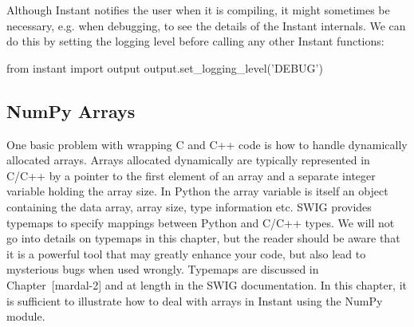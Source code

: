 
Although Instant notifies the user when it is compiling, it might
sometimes be necessary, e.g. when debugging, to see the details of the Instant
internals. We can do this by setting the logging level before calling any
other Instant functions:
\begin{python}
from instant import output
output.set_logging_level('DEBUG')
\end{python}

\subsection{NumPy Arrays}
One basic problem with wrapping C and C++ code is how to handle dynamically
allocated arrays. Arrays allocated
dynamically are typically represented in C/C++ by a pointer to the first element
of an array and a separate integer variable holding the array size. In Python
the array variable is itself an object containing the data array, array size,
type information etc. 
SWIG provides typemaps to specify  mappings between Python and C/C++ types. We
will not go into details on typemaps in this chapter, but the reader
should be aware that it is a powerful tool that may greatly enhance your
code, but also lead to mysterious bugs when used wrongly. Typemaps
are discussed in Chapter~[mardal-2] and at length in the SWIG documentation.
In this chapter, it is sufficient to illustrate how to deal
with arrays in Instant using the NumPy module. 

